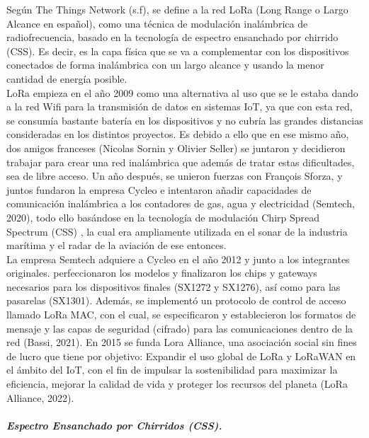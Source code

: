 \documentclass[12pt,a4paper]{article}
\begin{document}
	Según The Things Network (s.f), se define a la red LoRa (Long Range o Largo Alcance en español), como una técnica de modulación inalámbrica de radiofrecuencia, basado en la tecnología de espectro ensanchado por chirrido (CSS). Es decir, es la capa física que se va a complementar con los dispositivos conectados de forma inalámbrica con un largo alcance y usando la menor cantidad de energía posible.\\
	
	LoRa empieza en el año 2009 como una alternativa al uso que se le estaba dando a la red Wifi para la transmisión de datos en sistemas IoT, ya que con esta red, se consumía bastante batería en los dispositivos y no cubría las grandes distancias consideradas en los distintos proyectos. Es debido a ello que en ese mismo año, dos amigos franceses (Nicolas Sornin y Olivier Seller) se juntaron y decidieron trabajar para crear una red inalámbrica que además de tratar estas dificultades, sea de libre acceso. Un año después, se unieron fuerzas con François Sforza, y juntos fundaron la empresa Cycleo e intentaron añadir capacidades de comunicación inalámbrica a los contadores de gas, agua y electricidad (Semtech, 2020), todo ello basándose en la tecnología de modulación Chirp Spread Spectrum (CSS) , la cual era ampliamente utilizada en el sonar de la industria marítima y el radar de la aviación de ese entonces.\\
	
	La empresa Semtech adquiere a Cycleo en el año 2012 y junto a los integrantes originales. perfeccionaron los modelos y finalizaron los chips y gateways necesarios para los dispositivos finales (SX1272 y SX1276), así como para las pasarelas (SX1301). Además, se implementó un protocolo de control de acceso llamado LoRa MAC, con el cual, se especificaron y establecieron los formatos de mensaje y las capas de seguridad (cifrado) para las comunicaciones dentro de la red (Bassi, 2021).
	En 2015 se funda Lora Alliance, una asociación social sin fines de lucro que tiene por objetivo: Expandir el uso global de LoRa y LoRaWAN en el ámbito del IoT, con el fin de impulsar la sostenibilidad para maximizar la eficiencia, mejorar la calidad de vida y proteger los recursos del planeta (LoRa Alliance, 2022).
	
	\paragraph*{}
	
	\textbf{\textit{Espectro Ensanchado por Chirridos (CSS).}} \mbox{}\\
	
\end{document}
